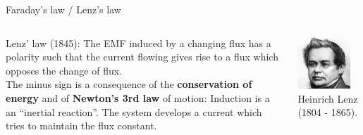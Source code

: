 \begin{frame}{Faraday's law / Lenz's law}
\begin{columns}
  \begin{column}{0.75\textwidth}
  {\scriptsize
    Lenz' law (1845): The EMF induced by a changing flux has a polarity
    such that the current flowing gives rise to a flux which opposes the change of flux.\\
    \vspace{0.1cm}
    The minus sign is a consequence of the {\bf conservation of energy} and
    of {\bf Newton's 3rd law} of motion: Induction is a an ``inertial reaction''.
    The system develops a current which tries to maintain the flux constant.\\
  }
  \end{column}
  \begin{column}{0.25\textwidth}
    \includegraphics[width=0.83\textwidth]{./images/people/lenz.jpg}\\
    {\tiny Heinrich Lenz (1804 - 1865).}
  \end{column}
\end{columns}

\end{frame}



%
%
%

